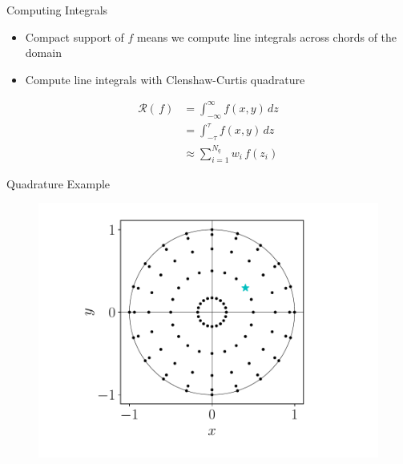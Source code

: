 \documentclass{beamer}
\begin{document}
\begin{frame}{Computing Integrals}
    \begin{itemize}
        \item
            Compact support of $f$ means we compute line integrals across chords of the domain
        \item
            Compute line integrals with Clenshaw-Curtis quadrature
    \end{itemize}
    \begin{align*}
    	\mathcal{R}(\,f) &= \int_{-\infty}^{\infty} f(x, y) \, dz\\ &= \int_{-\tau}^{\tau} f(x, y) \, dz\\ &\approx \sum_{i=1}^{N_q} w_{i} \, f(z_{i})
    \end{align*}
\end{frame}

\begin{frame}{Quadrature Example}
	\begin{figure}[H]
		\centering
		\includegraphics[scale=0.65]{figures/quad_1.pdf}
	\end{figure}
\end{frame}
\end{document}
